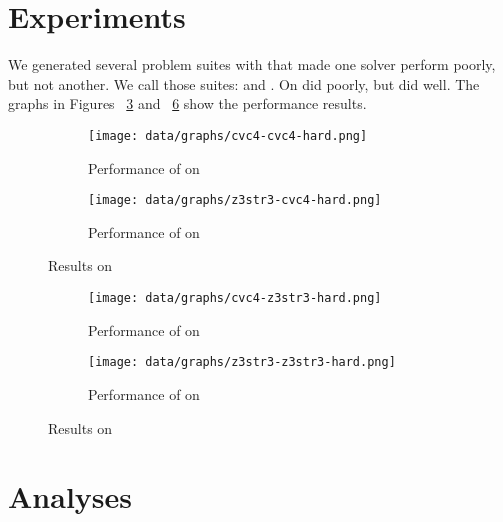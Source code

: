 \section{Experiments}

    We generated several problem suites with \fuzzer{} that made one solver perform poorly, but not another. We call those suites: \cHard{} and \zHard{}. On \cHard{} \cvc{} did poorly, but \us{} did well. The graphs in Figures ~\ref{fig:cvc4-hard} and ~\ref{fig:z3str3-hard} show the performance results.


    \begin{figure}[H]
        \begin{subfigure}{.5\textwidth}
            \texttt{[image: data/graphs/cvc4-cvc4-hard.png]}
            \caption{Performance of \cvc{} on \cHard{}}
            \label{fig:cvc4-cvc4-hard}
        \end{subfigure}
        \begin{subfigure}{.5\textwidth}
            \texttt{[image: data/graphs/z3str3-cvc4-hard.png]}
            \caption{Performance of \us{} on \cHard{}}
            \label{fig:z3str3-cvc4-hard}
        \end{subfigure}
        \caption{Results on \cHard}
        \label{fig:cvc4-hard}
    \end{figure}

    \begin{figure}[H]
        \begin{subfigure}{.5\textwidth}
            \texttt{[image: data/graphs/cvc4-z3str3-hard.png]}
            \caption{Performance of \cvc{} on \zHard{}}
            \label{fig:cvc4-z3str3-hard}
        \end{subfigure}
        \begin{subfigure}{.5\textwidth}
            \texttt{[image: data/graphs/z3str3-z3str3-hard.png]}
            \caption{Performance of \us{} on \zHard{}}
            \label{fig:z3str3-z3str3-hard}
        \end{subfigure}
        \caption{Results on \zHard}
        \label{fig:z3str3-hard}
    \end{figure}

\section{Analyses}

